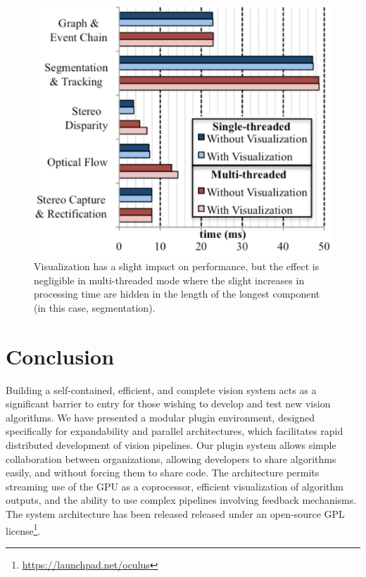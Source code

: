 \begin{figure}[t]
\begin{center}
   \includegraphics[width=0.5\linewidth]{TimingGraph.pdf}
\end{center}
   \caption[Performance Effect of Visualization]{Visualization has a slight impact on performance, but the effect is negligible in multi-threaded mode where the slight increases in processing time are hidden in the length of the longest component (in this case, segmentation).}
\label{fig:TestVis}
\end{figure}


\section{Conclusion}
Building a self-contained, efficient, and complete vision system acts as a significant barrier to entry for those wishing to develop and test new vision algorithms. We have presented a modular plugin environment, designed specifically for expandability and parallel architectures, which facilitates rapid distributed development of vision pipelines. Our plugin system allows simple collaboration between organizations, allowing developers to share algorithms easily, and without forcing them to share code. The architecture permits streaming use of the GPU as a coprocessor, efficient visualization of algorithm outputs, and the ability to use complex pipelines involving feedback mechanisms. The system architecture has been released released under an open-source GPL license\footnote{\url{https://launchpad.net/oculus}}.